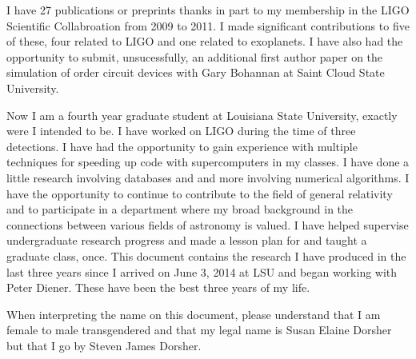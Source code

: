 \documentclass[12pt,letterpaper]{lsuetd}
\begin{document}
I have 27 publications or preprints thanks in part to my membership in the LIGO Scientific Collabroation from 2009 to 2011. I made significant contributions to five of these, four related to LIGO and one related to exoplanets. I have also had the opportunity to submit, unsucessfully, an additional first author paper on the simulation of order circuit devices with Gary Bohannan at Saint Cloud State University.

Now I am a fourth year graduate student at Louisiana State University, exactly were I intended to be. I have worked on LIGO during the time of three detections. I have had the opportunity to gain experience with multiple techniques for speeding up code with supercomputers in my classes. I have done a little research involving databases and and more involving numerical algorithms. I have the opportunity to continue to contribute to the field of general relativity and to participate in a department where my broad background in the connections between various fields of astronomy is valued. I have helped supervise undergraduate research progress and made a lesson plan for and taught a graduate class, once. This document contains the research I have produced in the last three years since I arrived on June 3, 2014 at LSU and began working with Peter Diener. These have been the best three years of my life.

When interpreting the name on this document, please understand that I am female to male transgendered and that my legal name is Susan Elaine Dorsher but that I go by Steven James Dorsher.
\end{document}
